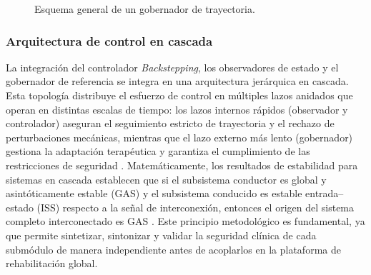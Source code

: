 \documentclass[a4paper,12pt]{article}
\begin{document}
\begin{figure}[H]
    \centering
    \caption{Esquema general de un gobernador de trayectoria.}
    \label{fig:gbt}
\end{figure}

\subsubsection{Arquitectura de control en cascada}

La integración del controlador \textit{Backstepping}, los observadores de estado y el gobernador de referencia se integra en una arquitectura jerárquica en cascada. Esta topología distribuye el esfuerzo de control en múltiples lazos anidados que operan en distintas escalas de tiempo: los lazos internos rápidos (observador y controlador) aseguran el seguimiento estricto de trayectoria y el rechazo de perturbaciones mecánicas, mientras que el lazo externo más lento (gobernador) gestiona la adaptación terapéutica y garantiza el cumplimiento de las restricciones de seguridad \citep{khalil2002nonlinear}. Matemáticamente, los resultados de estabilidad para sistemas en cascada establecen que si el subsistema conductor es global y asintóticamente estable (GAS) y el subsistema conducido es estable entrada--estado (ISS) respecto a la señal de interconexión, entonces el origen del sistema completo interconectado es GAS \citep{khalil2002nonlinear}. Este principio metodológico es fundamental, ya que permite sintetizar, sintonizar y validar la seguridad clínica de cada submódulo de manera independiente antes de acoplarlos en la plataforma de rehabilitación global.
\end{document}
